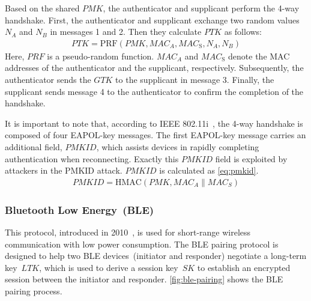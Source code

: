 \documentclass[../main.tex]{subfiles}
\begin{document}
Based on the shared $PMK$, the authenticator and supplicant perform the 4-way handshake.
First, the authenticator and supplicant exchange two random values $N_A$ and $N_B$ in messages 1 and 2. 
Then they calculate $PTK$ as follows:
\begin{equation}
    \begin{split}
        PTK = \text{PRF}(PMK,{MAC}_{A},{MAC}_\text{S}, N_A, N_B)
    \end{split} 
\end{equation}
Here, $PRF$ is a pseudo-random function. 
${MAC}_{A}$ and ${MAC}_\text{S}$ denote the MAC addresses of the authenticator and the supplicant, respectively.
Subsequently, the authenticator sends the $GTK$ to the supplicant in message 3.
Finally, the supplicant sends message 4 to the authenticator to confirm the completion of the handshake.

It is important to note that, according to IEEE 802.11i~\cite{80211i}, the 4-way handshake is composed of four EAPOL-key messages.
The first EAPOL-key message carries an additional field, $PMKID$, which assists devices in rapidly completing authentication when reconnecting. 
Exactly this $PMKID$ field is exploited by attackers in the PMKID attack.
$PMKID$ is calculated as \autoref{eq:pmkid}.
\begin{equation} \label{eq:pmkid}
    \begin{split}
        PMKID = \text{HMAC}(PMK, {MAC}_{A} \| {MAC}_{S})
    \end{split} 
\end{equation}

\subsubsection{Bluetooth Low Energy~(BLE)}

This protocol, introduced in 2010~\cite{bluetooth4}, is used for short-range wireless communication with low power consumption.
The BLE pairing protocol is designed to help two BLE devices~(initiator and responder) negotiate a long-term key~$LTK$,
which is used to derive a session key~$SK$ to establish an encrypted session between the initiator and responder.
\autoref{fig:ble-pairing} shows the BLE pairing process.
\end{document}
